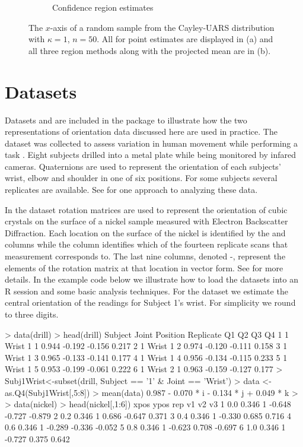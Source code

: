 \begin{figure}[h]
\begin{subfigure}[h]{.25\textheight}
		\caption{Confidence region estimates}
		\label{fig:regs}
	\end{subfigure}
	\caption{\label{figure:eye1}The $x$-axis of a random sample from the Cayley-UARS distribution with $\kappa=1$, $n=50$.  All for point estimates are displayed in (a) and all three region methods along with the projected mean are in (b).}
\end{figure}


\section{Datasets}

Datasets  and  are included in the  package to illustrate how the two representations of orientation data discussed here are used in practice.  The  dataset was collected to assess variation in human movement while performing a task \citep{rancourt1995}.  Eight subjects drilled into a metal plate while being monitored by infared cameras. Quaternions are used to represent the orientation of each subjects' wrist, elbow and shoulder in one of six positions.  For some subjects several replicates are available.  See \cite{rancourt2000} for one approach to analyzing these data.

In the  dataset rotation matrices are used to represent the orientation of cubic crystals on the surface of a nickel sample measured with Electron Backscatter Diffraction.  Each location on the surface of the nickel is identified by the  and  columns while the  column identifies which of the fourteen replicate scans that measurement corresponds to.  The last nine columns, denoted -, represent the elements of the rotation matrix at that location in vector form.  See \cite{bingham2009, bingham2010b, stanfill2013} for more details. In the example code below we illustrate how to load the datasets into an R session and some basic analysis techniques.  For the  dataset we estimate the central orientation of the readings for Subject 1's wrist.  For simplicity we round to three digits.

\begin{example}
> data(drill)
> head(drill)
  Subject Joint Position Replicate    Q1     Q2      Q3    Q4
1       1 Wrist        1         1 0.944 -0.192 -0.156 0.217
2       1 Wrist        1         2 0.974 -0.120 -0.111 0.158
3       1 Wrist        1         3 0.965 -0.133 -0.141 0.177
4       1 Wrist        1         4 0.956 -0.134 -0.115 0.233
5       1 Wrist        1         5 0.953 -0.199 -0.061 0.222
6       1 Wrist        2         1 0.963 -0.159 -0.127 0.177
> Subj1Wrist<-subset(drill, Subject == '1' & Joint == 'Wrist')
> data <- as.Q4(Subj1Wrist[,5:8])
> mean(data)
0.987 - 0.070 * i - 0.134 * j + 0.049 * k
>
> data(nickel)
> head(nickel[,1:6])
  xpos  ypos rep     v1     v2      v3
1  0.0 0.346   1 -0.648 -0.727 -0.879
2  0.2 0.346   1  0.686 -0.647  0.371
3  0.4 0.346   1 -0.330  0.685  0.716
4  0.6 0.346   1 -0.289 -0.336 -0.052
5  0.8 0.346   1 -0.623  0.708 -0.697
6  1.0 0.346   1 -0.727  0.375  0.642
\end{example}

